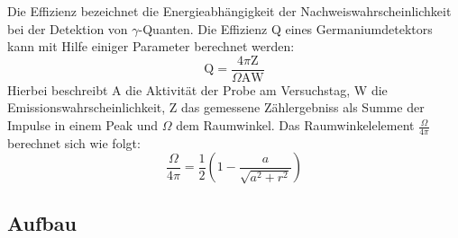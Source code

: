 Die Effizienz bezeichnet die Energieabhängigkeit der Nachweiswahrscheinlichkeit
bei der Detektion von $\gamma$-Quanten.
Die Effizienz Q eines Germaniumdetektors kann mit Hilfe einiger Parameter berechnet werden:
\begin{equation}
    \label{eq:effizienz}
    \text{Q} = \frac{4 \pi \text{Z}}{\Omega \text{A} \text{W}}
\end{equation}
Hierbei beschreibt A die Aktivität der Probe am Versuchstag, W die Emissionswahrscheinlichkeit, Z das gemessene Zählergebniss als Summe der Impulse in einem Peak und $\Omega$ dem Raumwinkel.
Das Raumwinkelelement $\frac{\Omega}{4\pi}$ berechnet sich wie folgt:
\begin{equation}
    \label{eq:Omega}
    \frac{\Omega}{4 \pi} = \frac{1}{2} \left(1- \frac{a}{\sqrt{a^2 + r^2}} \right)
\end{equation}

\subsection{Aufbau}

